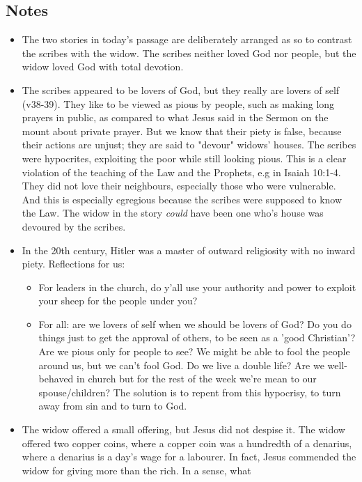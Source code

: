 \subsection*{Notes}
\begin{itemize}
  \item{The two stories in today's passage are deliberately arranged as so to
  contrast the scribes with the widow.  The scribes neither loved God nor
  people, but the widow loved God with total devotion.}
  \item{The scribes appeared to be lovers of God, but they really are lovers
  of self (v38-39).  They like to be viewed as pious by people, such as
  making long prayers in public, as compared to what Jesus said in the Sermon
  on the mount about private prayer.  But we know that their piety is false,
  because their actions are unjust; they are said to "devour" widows' houses.
  The scribes were hypocrites, exploiting the poor while still looking pious.
  This is a clear violation of the teaching of the Law and the Prophets, e.g
  in Isaiah 10:1-4.  They did not love their neighbours, especially those who
  were vulnerable.  And this is especially egregious because the scribes were
  supposed to know the Law.  The widow in the story \textit{could} have been
  one who's house was devoured by the scribes.}
  \item{In the 20th century, Hitler was a master of outward religiosity with
  no inward piety. Reflections for us:
  \begin{itemize}
    \item{For leaders in the church, do y'all use your authority and power to
    exploit your sheep for the people under you?}
    \item{For all: are we lovers of self when we should be lovers of God?  Do
    you do things just to get the approval of others, to be seen as a 'good
    Christian'?  Are we pious only for people to see?  We might be able to
    fool the people around us, but we can't fool God.  Do we live a double
    life?  Are we well-behaved in church but for the rest of the week we're
    mean to our spouse/children?  The solution is to repent from this
    hypocrisy, to turn away from sin and to turn to God.}
  \end{itemize}}
  \item{The widow offered a small offering, but Jesus did not despise it.
  The widow offered two copper coins, where a copper coin was a hundredth of
  a denarius, where a denarius is a day's wage for a labourer.  In fact,
  Jesus commended the widow for giving more than the rich.  In a sense, what
}
\end{itemize}
